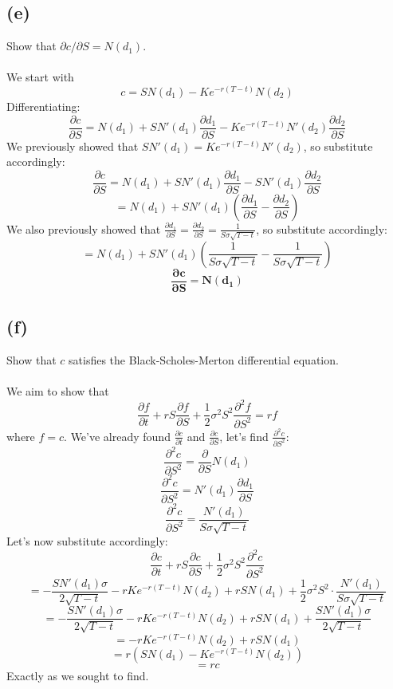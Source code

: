 \documentclass{article}
\begin{document}
{\subsection*{(e)}
Show that \(\partial c / \partial S = N(d_1)\). \\ \\
We start with 
\[
  c = SN(d_1) - Ke^{-r(T-t)} N(d_2)
\]
Differentiating:
\[
  \frac{\partial c}{\partial S} = N(d_1) + S N'(d_1) \frac{\partial d_1}{\partial S} - Ke^{-r(T-t)} N'(d_2) \frac{\partial d_2}{\partial S}
\]
We previously showed that \(SN'(d_1) = Ke^{-r(T-t)}N'(d_2)\), so substitute accordingly:
\[
  \frac{\partial c}{\partial S} = N(d_1) + S N'(d_1) \frac{\partial d_1}{\partial S} - S N'(d_1) \frac{\partial d_2}{\partial S}
\]
\[
  = N(d_1) + S N'(d_1) (\frac{\partial d_1}{\partial S} - \frac{\partial d_2}{\partial S})
\]
We also previously showed that \(\frac{\partial d_1}{\partial S} = \frac{\partial d_2}{\partial S} = \frac{1}{S \sigma \sqrt{T - t}}\), so substitute accordingly:
\[
  = N(d_1) + S N'(d_1) (\frac{1}{S \sigma \sqrt{T - t}} - \frac{1}{S \sigma \sqrt{T - t}})
\]
\[
  \boxed{\mathbf{\frac{\partial c}{\partial S} = N(d_1)}}
\]

\subsection*{(f)}
Show that \(c\) satisfies the Black-Scholes-Merton differential equation. \\ \\
We aim to show that 
\[
  \frac{\partial f}{\partial t} + rS\frac{\partial f}{\partial S} + \frac{1}{2}\sigma^2 S^2 \frac{\partial^2 f}{\partial S^2} = rf
\]
where \(f = c\). We've already found \(\frac{\partial c}{\partial t}\) and \(\frac{\partial c}{\partial S}\), let's find \(\frac{\partial^2 c}{\partial S^2}\):
\[
  \frac{\partial^2 c}{\partial S^2} = \frac{\partial }{\partial S} N(d_1)
\]
\[
  \frac{\partial^2 c}{\partial S^2} = N'(d_1) \frac{\partial d_1}{\partial S}
\]
\[
  \frac{\partial^2 c}{\partial S^2} = \frac{N'(d_1)}{S \sigma \sqrt{T - t}}
\]
Let's now substitute accordingly:
\[
  \frac{\partial c}{\partial t} + rS\frac{\partial c}{\partial S} + \frac{1}{2}\sigma^2 S^2 \frac{\partial^2 c}{\partial S^2}
\]
\[
  = - \frac{SN'(d_1) \sigma}{2 \sqrt{T - t}} - r Ke^{-r(T-t)} N(d_2) + r S N(d_1) + \frac{1}{2}\sigma^2 S^2 \cdot \frac{N'(d_1)}{S \sigma \sqrt{T - t}}
\]
\[
  = - \frac{SN'(d_1) \sigma}{2 \sqrt{T - t}} - r Ke^{-r(T-t)} N(d_2) + r S N(d_1) + \frac{SN'(d_1)\sigma}{2\sqrt{T - t}}
\]
\[
  = - r Ke^{-r(T-t)} N(d_2) + r S N(d_1) 
\]
\[
  = r (S N(d_1)  - Ke^{-r(T-t)} N(d_2))
\]
\[
  = rc
\]
Exactly as we sought to find. 

}
\end{document}

